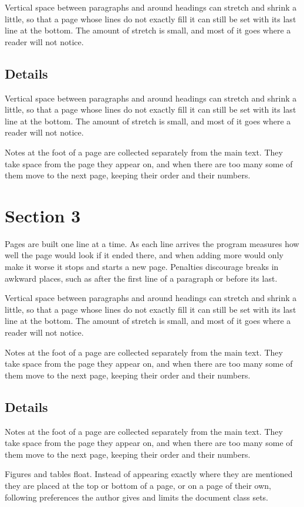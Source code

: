 \documentclass{article}
\begin{document}
Vertical space between paragraphs and around headings can stretch and shrink a little, so that a page whose lines do not exactly fill it can still be set with its last line at the bottom. The amount of stretch is small, and most of it goes where a reader will not notice.
\subsection{Details}
Vertical space between paragraphs and around headings can stretch and shrink a little, so that a page whose lines do not exactly fill it can still be set with its last line at the bottom. The amount of stretch is small, and most of it goes where a reader will not notice.

Notes at the foot of a page are collected separately from the main text. They take space from the page they appear on, and when there are too many some of them move to the next page, keeping their order and their numbers.
\section{Section 3}
Pages are built one line at a time. As each line arrives the program measures how well the page would look if it ended there, and when adding more would only make it worse it stops and starts a new page. Penalties discourage breaks in awkward places, such as after the first line of a paragraph or before its last.

Vertical space between paragraphs and around headings can stretch and shrink a little, so that a page whose lines do not exactly fill it can still be set with its last line at the bottom. The amount of stretch is small, and most of it goes where a reader will not notice.

Notes at the foot of a page are collected separately from the main text. They take space from the page they appear on, and when there are too many some of them move to the next page, keeping their order and their numbers.
\subsection{Details}
Notes at the foot of a page are collected separately from the main text. They take space from the page they appear on, and when there are too many some of them move to the next page, keeping their order and their numbers.

Figures and tables float. Instead of appearing exactly where they are mentioned they are placed at the top or bottom of a page, or on a page of their own, following preferences the author gives and limits the document class sets.
\end{document}
